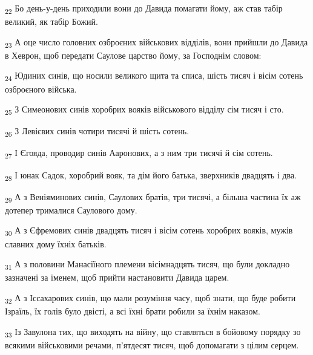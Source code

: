 \begin{tcolorbox}
\textsubscript{22} Бо день-у-день приходили вони до Давида помагати йому, аж став табір великий, як табір Божий.
\end{tcolorbox}
\begin{tcolorbox}
\textsubscript{23} А оце число головних озброєних військових відділів, вони прийшли до Давида в Хеврон, щоб передати Саулове царство йому, за Господнім словом:
\end{tcolorbox}
\begin{tcolorbox}
\textsubscript{24} Юдиних синів, що носили великого щита та списа, шість тисяч і вісім сотень озброєного війська.
\end{tcolorbox}
\begin{tcolorbox}
\textsubscript{25} З Симеонових синів хоробрих вояків військового відділу сім тисяч і сто.
\end{tcolorbox}
\begin{tcolorbox}
\textsubscript{26} З Левієвих синів чотири тисячі й шість сотень.
\end{tcolorbox}
\begin{tcolorbox}
\textsubscript{27} І Єгояда, проводир синів Ааронових, а з ним три тисячі й сім сотень.
\end{tcolorbox}
\begin{tcolorbox}
\textsubscript{28} І юнак Садок, хоробрий вояк, та дім його батька, зверхників двадцять і два.
\end{tcolorbox}
\begin{tcolorbox}
\textsubscript{29} А з Веніяминових синів, Саулових братів, три тисячі, а більша частина їх аж дотепер трималися Саулового дому.
\end{tcolorbox}
\begin{tcolorbox}
\textsubscript{30} А з Єфремових синів двадцять тисяч і вісім сотень хоробрих вояків, мужів славних дому їхніх батьків.
\end{tcolorbox}
\begin{tcolorbox}
\textsubscript{31} А з половини Манасіїного племени вісімнадцять тисяч, що були докладно зазначені за іменем, щоб прийти настановити Давида царем.
\end{tcolorbox}
\begin{tcolorbox}
\textsubscript{32} А з Іссахарових синів, що мали розуміння часу, щоб знати, що буде робити Ізраїль, їх голів було двісті, а всі їхні брати робили за їхнім наказом.
\end{tcolorbox}
\begin{tcolorbox}
\textsubscript{33} Із Завулона тих, що виходять на війну, що ставляться в бойовому порядку зо всякими військовими речами, п'ятдесят тисяч, щоб допомагати з цілим серцем.
\end{tcolorbox}
